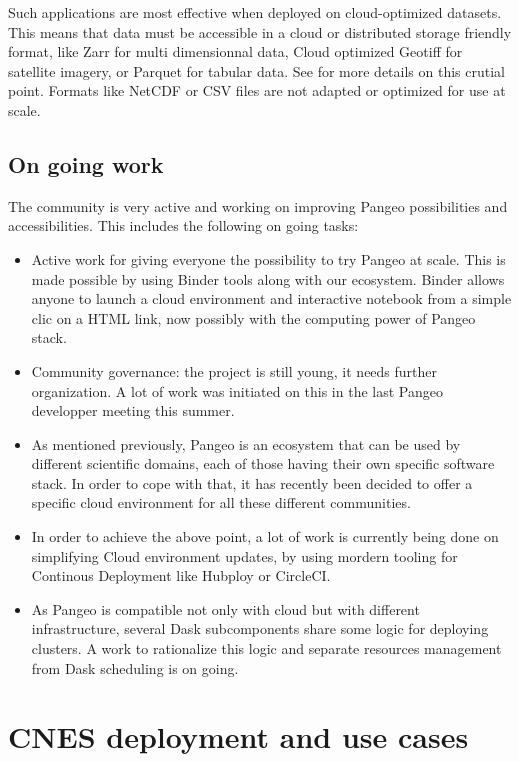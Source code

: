 \documentclass{article}
\begin{document}
Such applications are most effective when deployed on cloud-optimized datasets. This means that data must be accessible in a cloud or distributed storage friendly format, like Zarr for multi dimensionnal data, Cloud optimized Geotiff for satellite imagery, or Parquet for tabular data. See \cite{b7} for more details on this crutial point. Formats like NetCDF or CSV files are not adapted or optimized for use at scale.

\subsection{On going work}
\label{ssec:ongowork}

The community is very active and working on improving Pangeo possibilities and accessibilities. This includes the following on going tasks:
\begin{itemize}
\item Active work for giving everyone the possibility to try Pangeo at scale. This is made possible by using Binder tools along with our ecosystem\cite{b8}. Binder allows anyone to launch a cloud environment and interactive notebook from a simple clic on a HTML link, now possibly with the computing power of Pangeo stack.
\item Community governance: the project is still young, it needs further organization. A lot of work was initiated on this in the last Pangeo developper meeting this summer.
\item As mentioned previously, Pangeo is an ecosystem that can be used by different scientific domains, each of those having their own specific software stack. In order to cope with that, it has recently been decided to offer a specific cloud environment for all these different communities.
\item In order to achieve the above point, a lot of work is currently being done on simplifying Cloud environment updates, by using mordern tooling for Continous Deployment like Hubploy or CircleCI.
\item As Pangeo is compatible not only with cloud but with different infrastructure, several Dask subcomponents share some logic for deploying clusters. A work to rationalize this logic and separate resources management from Dask scheduling is on going.
\end{itemize}

\section{CNES deployment and use cases}
\label{sec:cnes}
\end{document}
